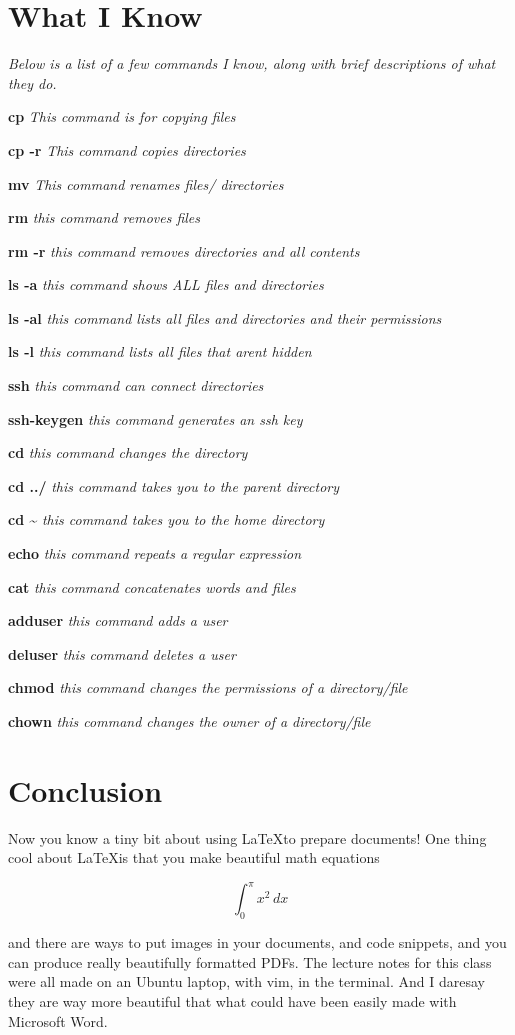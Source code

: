 \documentclass[11pt]{article}
\newcommand{\iknow}[2]{\par\textbf{#1} \textit{#2}}
\begin{document}
\section*{What I Know}

\noindent\textit{Below is a list of a few commands I know, along with brief descriptions of what they do.}
\iknow{cp}{This command is for copying files}
\iknow{cp -r}{This command copies directories}
\iknow{mv}{This command renames files/ directories}
\iknow{rm}{this command removes files}
\iknow{rm -r}{this command removes directories and all contents}
\iknow{ls -a}{this command shows ALL files and directories}
\iknow{ls -al}{this command lists all files and directories and their permissions}
\iknow{ls -l}{this command lists all files that arent hidden}
\iknow{ssh}{this command can connect directories}
\iknow{ssh-keygen}{this command generates an ssh key}
\iknow{cd}{this command changes the directory}
\iknow{cd ../}{this command takes you to the parent directory}
\iknow{cd \textasciitilde}{this command takes you to the home directory}
\iknow{echo}{this command repeats a regular expression}
\iknow{cat}{this command concatenates words and files}
\iknow{adduser}{this command adds a user}
\iknow{deluser}{this command deletes a user}
\iknow{chmod}{this command changes the permissions of a directory/file}
\iknow{chown}{this command changes the owner of a directory/file}

\section*{Conclusion}
Now you know a tiny bit about using \LaTeX to prepare documents! One thing cool about \LaTeX is that you make beautiful math equations

\begin{equation}
\int_{0}^{\pi}x^2\,dx
\end{equation}

and there are ways to put images in your documents, and code snippets, and you can produce really beautifully formatted PDFs. The lecture notes for this class were all made on an Ubuntu laptop, with vim, in the terminal. And I daresay they are way more beautiful that what could have been easily made with Microsoft Word.
\end{document}
